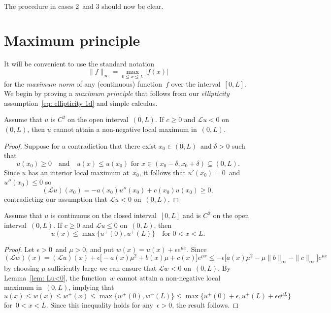 The procedure in cases 2~and 3 should now be clear.

\section{Maximum principle}
It will be convenient to use the standard notation
\[
\|f\|_\infty=\max_{0\le x\le L}|f(x)|
\]
for the \emph{maximum norm} of any (continuous) function~$f$ over 
the interval~$[0,L]$.  We begin by proving a \emph{maximum principle} that 
follows from our \emph{ellipticity} assumption~\eqref{eq: ellipticity 1d} and 
simple calculus.

\begin{lemma}\label{lem: Lu<0}
Assume that $u$ is $C^2$ on the open interval~$(0,L)$.
If $c\ge0$ and $\mathcal{L}u<0$ on~$(0,L)$, then $u$ cannot attain a 
non-negative local maximum in~$(0,L)$.
\end{lemma}
\begin{proof}
Suppose for a contradiction that there exist $x_0\in(0,L)$~and $\delta>0$ such
that
\[
u(x_0)\ge0\quad\text{and}\quad
\text{$u(x)\le u(x_0)$ for~$x\in(x_0-\delta,x_0+\delta)\subseteq(0,L)$.}
\]
Since $u$ has an interior local maximum at~$x_0$, it follows that 
$u'(x_0)=0$~and $u''(x_0)\le0$ so 
\[
(\mathcal{L}u)(x_0)=-a(x_0)u''(x_0)+c(x_0)u(x_0)\ge 0,
\]
contradicting our assumption that $\mathcal{L}u<0$ on~$(0,L)$.
\end{proof}



\begin{theorem}\label{thm: max principle 1d}
Assume that $u$ is continuous on the closed interval~$[0,L]$ and is $C^2$ on 
the open interval~$(0,L)$. If $c\ge0$ and $\mathcal{L}u\le0$ on~$(0,L)$, then
\[
u(x)\le\max\{u^+(0),u^+(L)\}\quad\text{for $0<x<L$.}
\]
\end{theorem}
\begin{proof}
Let $\epsilon>0$~and $\mu>0$, and put $w(x)=u(x)+\epsilon e^{\mu x}$.  Since
\[
(\mathcal{L}w)(x)
	=(\mathcal{L}u)(x)+\epsilon\bigl[-a(x)\mu^2+b(x)\mu+c(x)\bigr]e^{\mu x}
	\le-\epsilon\bigl[a(x)\mu^2-\mu\|b\|_\infty-\|c\|_\infty\bigr]e^{\mu x}
\]
by choosing $\mu$ sufficiently large we can ensure that $\mathcal{L}w<0$
on~$(0,L)$.  By Lemma~\ref{lem: Lu<0}, the function~$w$ cannot attain a 
non-negative local maximum in~$(0,L)$, implying that 
\[
u(x)\le w(x)\le w^+(x)\le\max\{w^+(0),w^+(L)\}
	\le\max\{u^+(0)+\epsilon,u^+(L)+\epsilon e^{\mu L}\}
\]
for~$0<x<L$.  Since this inequality holds for any~$\epsilon>0$, the result 
follows.
\end{proof}

